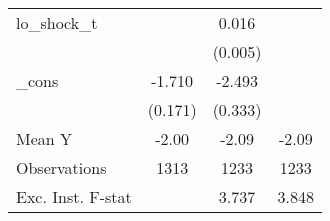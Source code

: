 {\begin{tabular}{l*{3}{c}}
\addlinespace
lo\_shock\_t  &                     &       0.016\sym{***}&                     \\
            &                     &     (0.005)         &                     \\
\addlinespace
\_cons      &      -1.710\sym{***}&      -2.493\sym{***}&                     \\
            &     (0.171)         &     (0.333)         &                     \\
\midrule
Mean Y      &       -2.00         &       -2.09         &       -2.09         \\
Observations&        1313         &        1233         &        1233         \\
Exc. Inst. F-stat&                     &       3.737         &       3.848         \\
\bottomrule
\end{tabular}
}
